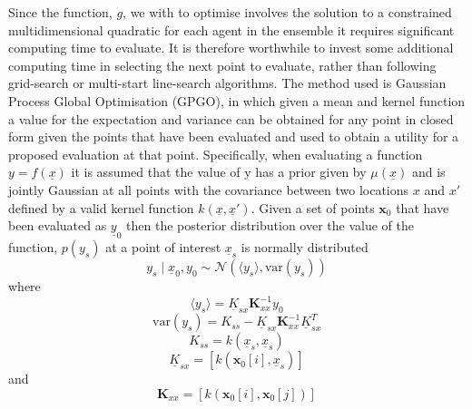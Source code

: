 \documentclass[a4paper, 10 pt, conference]{ieeeconf}  %
\begin{document}
Since the function, $g$, we with to optimise involves the solution to a constrained multidimensional quadratic for each agent in the ensemble it requires significant computing time to evaluate. It is therefore worthwhile to invest some additional computing time in selecting the next point to evaluate, rather than following grid-search or multi-start line-search algorithms. The method used is Gaussian Process Global Optimisation (GPGO)\cite{garnettgaussian}, in which given a mean and kernel function a value for the expectation and variance can be obtained for any point in closed form given the points that have been evaluated and used to obtain a utility for a proposed evaluation at that point.
Specifically, when evaluating a function $y=f(\underline{x})$  it is assumed that the value of y has a prior given by $\mu (\underline{x})$ and is jointly Gaussian at all points with the covariance between two locations $x$ and $x'$ defined by a valid kernel function $k(\underline{x},\underline{x}')$. Given a set of points $\mathbf{x}_{0}$ that have been evaluated as $\underline{y}_{0}$ then the posterior distribution over the value of the function, $p(y_{s})$ at a point of interest $\underline{x}_s$ is normally distributed
\begin{equation}
 y_{s}\mid \underline{x}_{0},y_{0}\sim\mathcal{N}\left( \langle y_{s}\rangle ,\mathrm{var}(y_{s})\right)
\end{equation}
where
\begin{equation}
\langle y_{s}\rangle 	=\underline{K}_{sx}\mathbf{K}_{xx}^{-1}y_{0}
\end{equation}
\begin{equation}
\mathrm{var}\left(y_{s}\right)	=K_{ss}-\underline{K}_{sx} \mathbf{K}_{xx}^{-1} \underline{K}_{sx}^{T}
\end{equation}
\begin{equation}
K_{ss}	= k(\underline{x}_s,\underline{x}_s)
\end{equation}
\begin{equation}
\underline{K}_{sx}	=[k\left(\mathbf{x}_{0}[i],\underline{x}_s\right)]
\end{equation}
and
\begin{equation}
\mathbf{K}_{xx}	=[k\left(\mathbf{x}_{0}[i],\mathbf{x}_{0}[j]\right)]
\end{equation}
\end{document}
